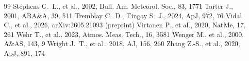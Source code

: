 \documentclass[twocolumn,twocolappendix,numberedappendix,appendixfloats]{openjournal}
\begin{document}
\begin{thebibliography}{99}
 Stephens G.~L., et al., 2002, Bull. Am. Meteorol. Soc., 83, 1771
 Tarter J., 2001, ARA\&A, 39, 511
 Tremblay C.~D., Tingay S.~J., 2024, ApJ, 972, 76
 Vidal C., et al., 2026, arXiv:2605.21093 (preprint)
 Virtanen P., et al., 2020, NatMe, 17, 261
 Wehr T., et al., 2023, Atmos. Meas. Tech., 16, 3581
 Wenger M., et al., 2000, A\&AS, 143, 9
 Wright J.~T., et al., 2018, AJ, 156, 260
 Zhang Z.-S., et al., 2020, ApJ, 891, 174
\end{thebibliography}
\end{document}
